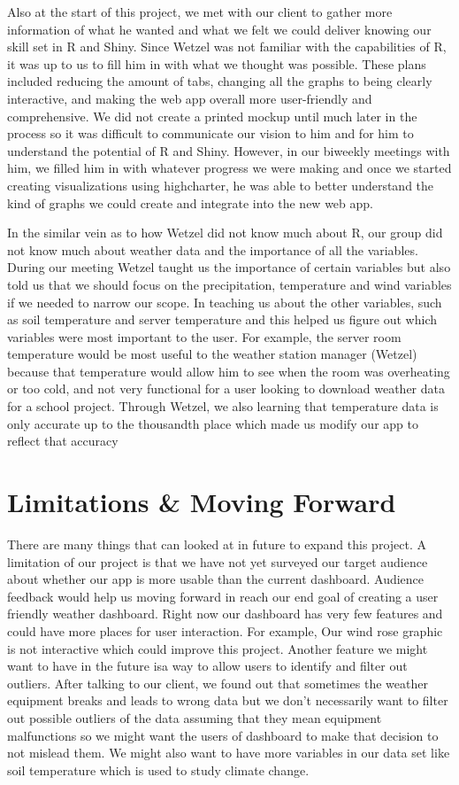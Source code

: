 \documentclass[10pt,letterpaper]{article}
\begin{document}
Also at the start of this project, we met with our client to gather more
information of what he wanted and what we felt we could deliver knowing
our skill set in R and Shiny. Since Wetzel was not familiar with the
capabilities of R, it was up to us to fill him in with what we thought
was possible. These plans included reducing the amount of tabs, changing
all the graphs to being clearly interactive, and making the web app
overall more user-friendly and comprehensive. We did not create a
printed mockup until much later in the process so it was difficult to
communicate our vision to him and for him to understand the potential of
R and Shiny. However, in our biweekly meetings with him, we filled him
in with whatever progress we were making and once we started creating
visualizations using highcharter, he was able to better understand the
kind of graphs we could create and integrate into the new web app.

In the similar vein as to how Wetzel did not know much about R, our
group did not know much about weather data and the importance of all the
variables. During our meeting Wetzel taught us the importance of certain
variables but also told us that we should focus on the precipitation,
temperature and wind variables if we needed to narrow our scope. In
teaching us about the other variables, such as soil temperature and
server temperature and this helped us figure out which variables were
most important to the user. For example, the server room temperature
would be most useful to the weather station manager (Wetzel) because
that temperature would allow him to see when the room was overheating or
too cold, and not very functional for a user looking to download weather
data for a school project. Through Wetzel, we also learning that
temperature data is only accurate up to the thousandth place which made
us modify our app to reflect that accuracy

\section{Limitations \& Moving
Forward}\label{limitations-moving-forward}

There are many things that can looked at in future to expand this
project. A limitation of our project is that we have not yet surveyed
our target audience about whether our app is more usable than the
current dashboard. Audience feedback would help us moving forward in
reach our end goal of creating a user friendly weather dashboard. Right
now our dashboard has very few features and could have more places for
user interaction. For example, Our wind rose graphic is not interactive
which could improve this project. Another feature we might want to have
in the future isa way to allow users to identify and filter out
outliers. After talking to our client, we found out that sometimes the
weather equipment breaks and leads to wrong data but we don't
necessarily want to filter out possible outliers of the data assuming
that they mean equipment malfunctions so we might want the users of
dashboard to make that decision to not mislead them. We might also want
to have more variables in our data set like soil temperature which is
used to study climate change.
\end{document}
